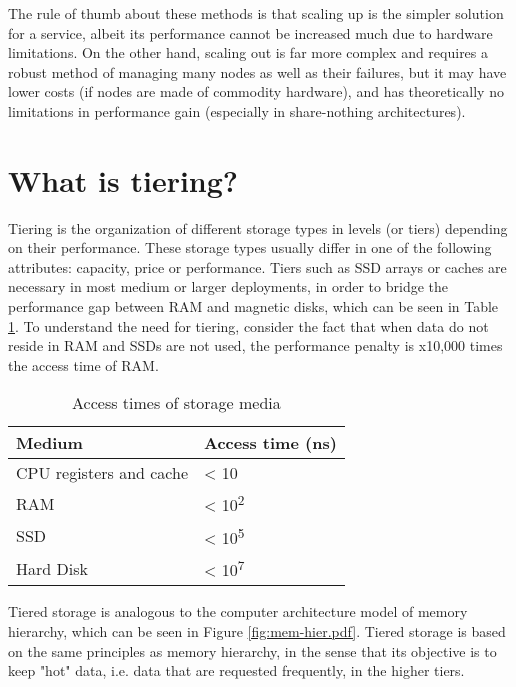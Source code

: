 The rule of thumb about these methods is that scaling up is the simpler 
solution for a service, albeit its performance cannot be increased much due to 
hardware limitations.  On the other hand, scaling out is far more complex and 
requires a robust method of managing many nodes as well as their failures, but 
it may have lower costs (if nodes are made of commodity hardware), and has 
theoretically no limitations in performance gain (especially in share-nothing 
architectures).

\section{What is tiering?}\label{sec:tiering-triad}

Tiering is the organization of different storage types in levels (or tiers) 
depending on their performance.  These storage types usually differ in one of 
the following attributes: capacity, price or performance.  Tiers such as SSD 
arrays or caches are necessary in most medium or larger deployments, in order 
to bridge the performance gap between RAM and magnetic disks, which can be seen 
in Table \ref{tab:gap}. To understand the need for tiering, consider the fact 
that when data do not reside in RAM and SSDs are not used, the performance 
penalty is x10,000 times the access time of RAM.

\begin{table}
	\centering
	\begin{tabular}{ | l | l | }
		\hline
		Medium & Access time (ns) \\ \hline \hline
		CPU registers and cache & < 10 \\ \hline
		RAM & < 10\textsuperscript{2}  \\ \hline
		SSD & < 10\textsuperscript{5} \\ \hline
		Hard Disk & < 10\textsuperscript{7} \\ \hline
	\end{tabular}
	\caption{Access times of storage media}
	\label{tab:gap}
\end{table}

Tiered storage is analogous to the computer architecture model of memory 
hierarchy, which can be seen in Figure \ref{fig:mem-hier.pdf}. Tiered storage 
is based on the same principles as memory hierarchy, in the sense that its 
objective is to keep "hot" data, i.e. data that are requested frequently, in 
the higher tiers.


